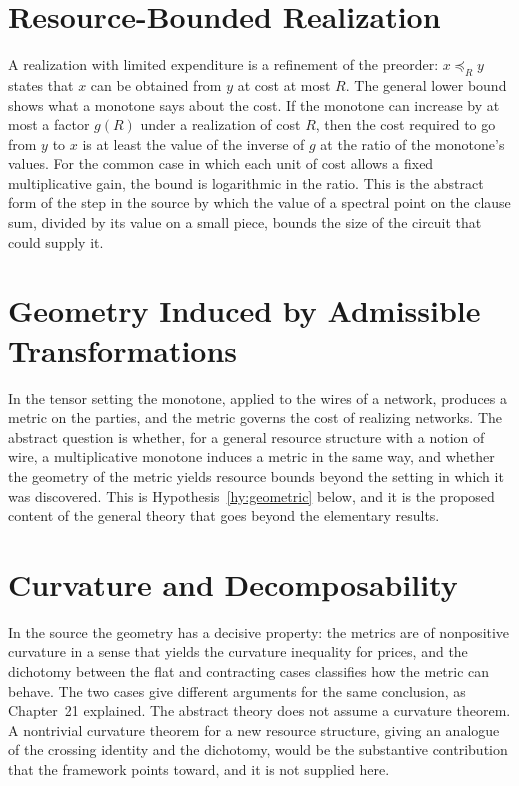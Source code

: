 \documentclass[11pt,letterpaper]{report}
\theoremstyle{plain}
\theoremstyle{definition}
\theoremstyle{remark}
\begin{document}
\section{Resource-Bounded Realization}

A realization with limited expenditure is a refinement of the preorder: $x\preceq_Ry$ states that $x$ can be obtained from $y$ at cost at most $R$. The general lower bound shows what a monotone says about the cost. If the monotone can increase by at most a factor $g(R)$ under a realization of cost $R$, then the cost required to go from $y$ to $x$ is at least the value of the inverse of $g$ at the ratio of the monotone's values. For the common case in which each unit of cost allows a fixed multiplicative gain, the bound is logarithmic in the ratio. This is the abstract form of the step in the source by which the value of a spectral point on the clause sum, divided by its value on a small piece, bounds the size of the circuit that could supply it.

\section{Geometry Induced by Admissible Transformations}

In the tensor setting the monotone, applied to the wires of a network, produces a metric on the parties, and the metric governs the cost of realizing networks. The abstract question is whether, for a general resource structure with a notion of wire, a multiplicative monotone induces a metric in the same way, and whether the geometry of the metric yields resource bounds beyond the setting in which it was discovered. This is Hypothesis~\ref{hy:geometric} below, and it is the proposed content of the general theory that goes beyond the elementary results.

\section{Curvature and Decomposability}

In the source the geometry has a decisive property: the metrics are of nonpositive curvature in a sense that yields the curvature inequality for prices, and the dichotomy between the flat and contracting cases classifies how the metric can behave. The two cases give different arguments for the same conclusion, as Chapter~21 explained. The abstract theory does not assume a curvature theorem. A nontrivial curvature theorem for a new resource structure, giving an analogue of the crossing identity and the dichotomy, would be the substantive contribution that the framework points toward, and it is not supplied here.
\end{document}
